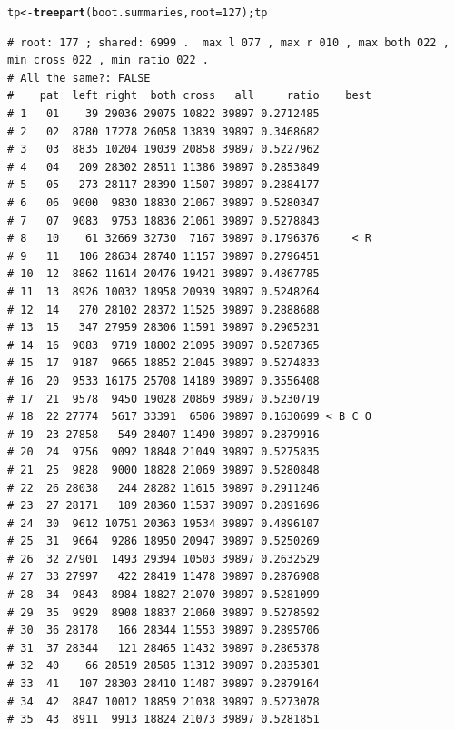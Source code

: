 \documentclass{article}\usepackage[]{graphicx}\usepackage[]{color}
\makeatletter
\newcommand{\hlnum}[1]{\textcolor[rgb]{0.686,0.059,0.569}{#1}}%
\newcommand{\hlstd}[1]{\textcolor[rgb]{0.345,0.345,0.345}{#1}}%
\newcommand{\hlkwb}[1]{\textcolor[rgb]{0.69,0.353,0.396}{#1}}%
\newcommand{\hlkwc}[1]{\textcolor[rgb]{0.333,0.667,0.333}{#1}}%
\newcommand{\hlkwd}[1]{\textcolor[rgb]{0.737,0.353,0.396}{\textbf{#1}}}%
\newenvironment{kframe}{%
 \def\at@end@of@kframe{}%
 \ifinner\ifhmode%
  \def\at@end@of@kframe{\end{minipage}}%
  \begin{minipage}{\columnwidth}%
 \fi\fi%
 \def\FrameCommand##1{\hskip\@totalleftmargin \hskip-\fboxsep
 \colorbox{shadecolor}{##1}\hskip-\fboxsep
     \hskip-\linewidth \hskip-\@totalleftmargin \hskip\columnwidth}%
 \MakeFramed {\advance\hsize-\width
   \@totalleftmargin\z@ \linewidth\hsize
   \@setminipage}}%
 {\par\unskip\endMakeFramed%
 \at@end@of@kframe}
\newenvironment{knitrout}{}{} %
\makeatother
\begin{document}
\begin{knitrout}\scriptsize
{}\color{fgcolor}\begin{kframe}
\begin{alltt}
\hlstd{tp} \hlkwb{<-} \hlkwd{treepart}\hlstd{(boot.summaries,}\hlkwc{root}\hlstd{=}\hlnum{127}\hlstd{) ; tp}
\end{alltt}
\begin{verbatim}
# root: 177 ; shared: 6999 .  max l 077 , max r 010 , max both 022 , min cross 022 , min ratio 022 . 
# All the same?: FALSE
#    pat  left right  both cross   all     ratio    best
# 1   01    39 29036 29075 10822 39897 0.2712485        
# 2   02  8780 17278 26058 13839 39897 0.3468682        
# 3   03  8835 10204 19039 20858 39897 0.5227962        
# 4   04   209 28302 28511 11386 39897 0.2853849        
# 5   05   273 28117 28390 11507 39897 0.2884177        
# 6   06  9000  9830 18830 21067 39897 0.5280347        
# 7   07  9083  9753 18836 21061 39897 0.5278843        
# 8   10    61 32669 32730  7167 39897 0.1796376     < R
# 9   11   106 28634 28740 11157 39897 0.2796451        
# 10  12  8862 11614 20476 19421 39897 0.4867785        
# 11  13  8926 10032 18958 20939 39897 0.5248264        
# 12  14   270 28102 28372 11525 39897 0.2888688        
# 13  15   347 27959 28306 11591 39897 0.2905231        
# 14  16  9083  9719 18802 21095 39897 0.5287365        
# 15  17  9187  9665 18852 21045 39897 0.5274833        
# 16  20  9533 16175 25708 14189 39897 0.3556408        
# 17  21  9578  9450 19028 20869 39897 0.5230719        
# 18  22 27774  5617 33391  6506 39897 0.1630699 < B C O
# 19  23 27858   549 28407 11490 39897 0.2879916        
# 20  24  9756  9092 18848 21049 39897 0.5275835        
# 21  25  9828  9000 18828 21069 39897 0.5280848        
# 22  26 28038   244 28282 11615 39897 0.2911246        
# 23  27 28171   189 28360 11537 39897 0.2891696        
# 24  30  9612 10751 20363 19534 39897 0.4896107        
# 25  31  9664  9286 18950 20947 39897 0.5250269        
# 26  32 27901  1493 29394 10503 39897 0.2632529        
# 27  33 27997   422 28419 11478 39897 0.2876908        
# 28  34  9843  8984 18827 21070 39897 0.5281099        
# 29  35  9929  8908 18837 21060 39897 0.5278592        
# 30  36 28178   166 28344 11553 39897 0.2895706        
# 31  37 28344   121 28465 11432 39897 0.2865378        
# 32  40    66 28519 28585 11312 39897 0.2835301        
# 33  41   107 28303 28410 11487 39897 0.2879164        
# 34  42  8847 10012 18859 21038 39897 0.5273078        
# 35  43  8911  9913 18824 21073 39897 0.5281851        

\end{verbatim}
\end{kframe}
\end{knitrout}
\end{document}
